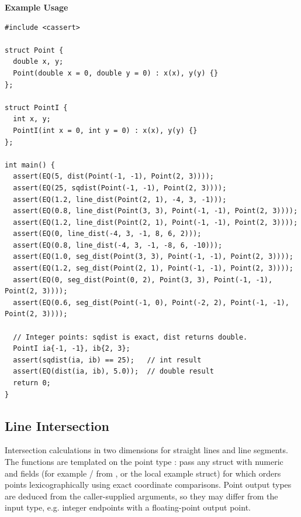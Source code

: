 \textbf{Example Usage}\par
\begin{lstlisting}[style=cpp]
#include <cassert>

struct Point {
  double x, y;
  Point(double x = 0, double y = 0) : x(x), y(y) {}
};

struct PointI {
  int x, y;
  PointI(int x = 0, int y = 0) : x(x), y(y) {}
};

int main() {
  assert(EQ(5, dist(Point(-1, -1), Point(2, 3))));
  assert(EQ(25, sqdist(Point(-1, -1), Point(2, 3))));
  assert(EQ(1.2, line_dist(Point(2, 1), -4, 3, -1)));
  assert(EQ(0.8, line_dist(Point(3, 3), Point(-1, -1), Point(2, 3))));
  assert(EQ(1.2, line_dist(Point(2, 1), Point(-1, -1), Point(2, 3))));
  assert(EQ(0, line_dist(-4, 3, -1, 8, 6, 2)));
  assert(EQ(0.8, line_dist(-4, 3, -1, -8, 6, -10)));
  assert(EQ(1.0, seg_dist(Point(3, 3), Point(-1, -1), Point(2, 3))));
  assert(EQ(1.2, seg_dist(Point(2, 1), Point(-1, -1), Point(2, 3))));
  assert(EQ(0, seg_dist(Point(0, 2), Point(3, 3), Point(-1, -1), Point(2, 3))));
  assert(EQ(0.6, seg_dist(Point(-1, 0), Point(-2, 2), Point(-1, -1), Point(2, 3))));

  // Integer points: sqdist is exact, dist returns double.
  PointI ia{-1, -1}, ib{2, 3};
  assert(sqdist(ia, ib) == 25);   // int result
  assert(EQ(dist(ia, ib), 5.0));  // double result
  return 0;
}
\end{lstlisting}
\subsection{Line Intersection}
\label{sec:7.2.3}
Intersection calculations in two dimensions for straight lines and line segments. The functions are templated on the point type : pass any struct with numeric  and  fields (for example / from , or the local example struct) for which  orders points lexicographically using exact coordinate comparisons. Point output types are deduced from the caller-supplied arguments, so they may differ from the input type, e.g. integer endpoints with a floating-point output point.

